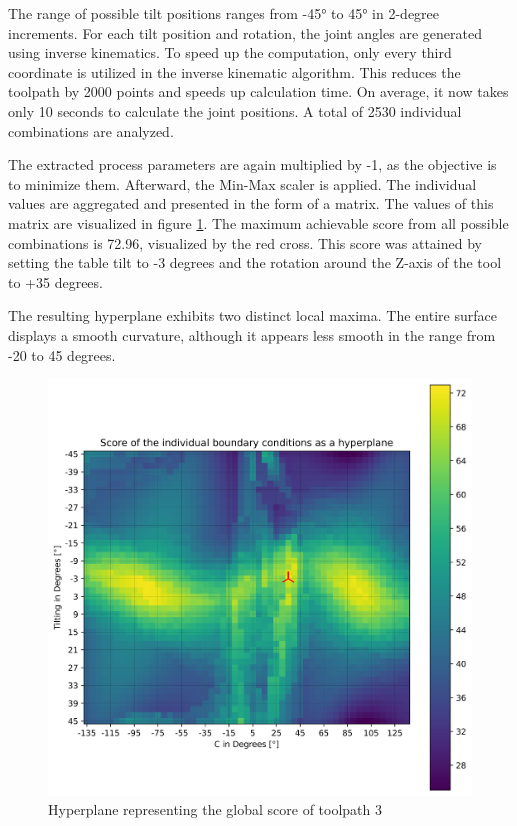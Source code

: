 The range of possible tilt positions ranges from -45° to 45° in 2-degree increments. For each tilt position and rotation, the joint angles are generated using inverse kinematics. To speed up the computation, only every third coordinate is utilized in the inverse kinematic algorithm. This reduces the toolpath by 2000 points and speeds up calculation time. On average, it now takes only 10 seconds to calculate the joint positions. A total of 2530 individual combinations are analyzed.

The extracted process parameters are again multiplied by -1, as the objective is to minimize them. Afterward, the Min-Max scaler is applied. The individual values are aggregated and presented in the form of a matrix. The values of this matrix are visualized in figure \ref{best_2D}. The maximum achievable score from all possible combinations is 72.96, visualized by the red cross. This score was attained by setting the table tilt to -3 degrees and the rotation around the Z-axis of the tool to +35 degrees.

The resulting hyperplane exhibits two distinct local maxima. The entire surface displays a smooth curvature, although it appears less smooth in the range from -20 to 45 degrees.


\begin{figure}[H]
	\centerline{\includegraphics[width=1\textwidth]{figures/best_2D_3.png}}
	\caption{Hyperplane representing the global score of toolpath 3}
	\label{best_2D}
\end{figure}


